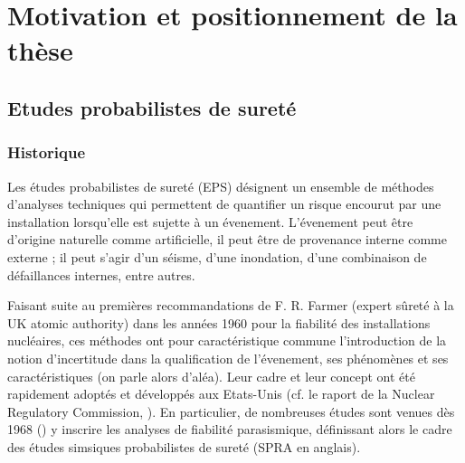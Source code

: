 \minitoc

\section{Motivation et positionnement de la thèse}

\subsection{Etudes probabilistes de sureté}
%

\subsubsection{Historique}

Les études probabilistes de sureté (EPS) désignent un ensemble de méthodes d'analyses techniques qui permettent de quantifier un risque encourut par une installation lorsqu'elle est sujette à un évenement. L'évenement peut être d'origine naturelle comme artificielle, il peut être de provenance interne comme externe ; il peut s'agir d'un séisme, d'une inondation, d'une combinaison de défaillances internes, entre autres.  %

Faisant suite au premières recommandations de F. R. Farmer (expert sûreté à la UK atomic authority) dans les années 1960 pour la fiabilité des installations nucléaires,
ces méthodes ont pour caractéristique commune l'introduction de la notion d'incertitude dans la qualification de l'évenement, ses phénomènes et ses caractéristiques (on parle alors d'aléa).
%
%
Leur cadre et leur concept ont été rapidement adoptés et développés aux Etats-Unis (cf. le raport de la Nuclear Regulatory Commission, \cite{nrc_pra_1983}). En particulier, de nombreuses études sont venues dès 1968 (\cite{cornell_engineering_1968}) 
y inscrire les analyses de fiabilité parasismique, définissant alors le cadre des études simsiques probabilistes de sureté (SPRA en anglais). %



